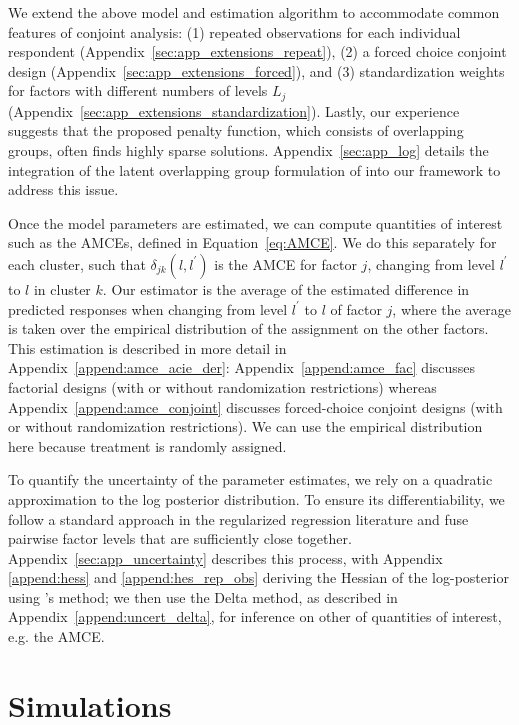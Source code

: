 We extend the above model and estimation algorithm to accommodate
common features of conjoint analysis: (1) repeated observations for
each individual respondent (Appendix~\ref{sec:app_extensions_repeat}),
(2) a forced choice conjoint design
(Appendix~\ref{sec:app_extensions_forced}), and (3) standardization
weights for factors with different numbers of levels $L_j$
(Appendix~\ref{sec:app_extensions_standardization}). Lastly, our
experience suggests that the proposed penalty function, which consists
of overlapping groups, often finds highly sparse
solutions. Appendix~\ref{sec:app_log} details the integration of the
latent overlapping group formulation of \cite{yan2017hierarchical}
into our framework to address this issue.

Once the model parameters are estimated, we can compute quantities of
interest such as the AMCEs, defined in Equation~\eqref{eq:AMCE}.  We
do this separately for each cluster, such that
$\delta_{jk} (l, l^\prime)$ is the AMCE for factor $j$, changing from
level $l^{\prime}$ to $l$ in cluster $k$.  Our estimator is the
average of the estimated difference in predicted responses when
changing from level $l^{\prime}$ to $l$ of factor $j$, where the
average is taken over the empirical distribution of the assignment on
the other factors.  This estimation is described in more detail in
Appendix~\ref{append:amce_acie_der}: Appendix~\ref{append:amce_fac}
discusses factorial designs (with or without randomization
restrictions) whereas Appendix~\ref{append:amce_conjoint} discusses
forced-choice conjoint designs (with or without randomization
restrictions).  We can use the empirical distribution here because
treatment is randomly assigned.

To quantify the uncertainty of the parameter estimates, we rely on a
quadratic approximation to the log posterior distribution. To ensure
its differentiability, we follow a standard approach in the
regularized regression literature \citep[e.g.,][]{fan2001variable} and 
fuse pairwise factor levels that are sufficiently close
together. Appendix~\ref{sec:app_uncertainty} describes this process,
with Appendix \ref{append:hess} and \ref{append:hes_rep_obs} deriving
the Hessian of the log-posterior using \cite{loui:82}'s method; we
then use the Delta method, as described in
Appendix~\ref{append:uncert_delta}, for inference on other of
quantities of interest, e.g. the AMCE.


\section{Simulations}\label{sec:simulation}

